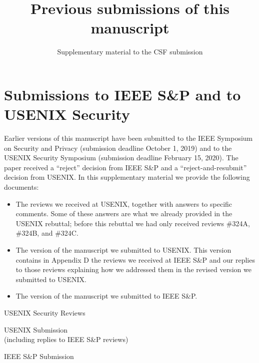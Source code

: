 \documentclass[a4paper]{scrartcl}
\title{Previous submissions of this manuscript}
\subtitle{Supplementary material to the CSF submission}
\date{}
\author{}
\newcommand{\todo}[1]{
  {\color{red} \textbf{ TODO: #1}}
}
\begin{document}
  \maketitle

\section*{Submissions to IEEE S\&P and to USENIX Security}
Earlier versions of this manuscript have been submitted 
to the IEEE Symposium on Security and Privacy (submission deadline October 1, 2019)
and to the USENIX Security Symposium (submission deadline February 15, 2020).
The paper received a ``reject'' decision from IEEE S\&P and a ``reject-and-resubmit''
decision from USENIX. In this supplementary material we provide the following documents:
\begin{itemize}
  \item The reviews we received at USENIX, together with answers to specific comments.
    Some of these answers are what we already provided in the USENIX rebuttal;
    before this rebuttal we had only received reviews \#324A, \#324B, and \#324C.
  \item The version of the manuscript we submitted to USENIX. This version
    contains in Appendix D the reviews we received at IEEE S\&P and our replies
    to those reviews explaining how we addressed them in the revised version
    we submitted to USENIX.
  \item The version of the manuscript we submitted to IEEE S\&P.
\end{itemize}



\newpage
\vspace*{7cm}
\begin{center}
  \textsf{
\Huge{USENIX Security Reviews}
}
\end{center}
\newpage









\newpage
\vspace*{7cm}
\begin{center}
  \textsf{
\Huge{USENIX Submission}\\
\large{(including replies to IEEE S\&P reviews)}
}
\end{center}
\newpage



\newpage
\vspace*{7cm}
\begin{center}
  \textsf{
\Huge{IEEE S\&P Submission}\\
}
\end{center}
\newpage


\end{document}
